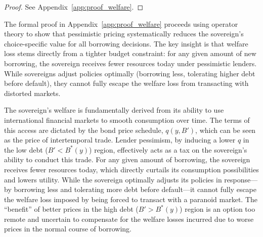 \documentclass[12pt]{article}
\theoremstyle{plain}
\begin{document}
\begin{proof}
	See Appendix~\ref{app:proof_welfare}.
\end{proof}
The formal proof in Appendix~\ref{app:proof_welfare} proceeds using operator theory to show that pessimistic pricing systematically reduces the sovereign's choice-specific value for all borrowing decisions. The key insight is that welfare loss stems directly from a tighter budget constraint: for any given amount of new borrowing, the sovereign receives fewer resources today under pessimistic lenders. While sovereigns adjust policies optimally (borrowing less, tolerating higher debt before default), they cannot fully escape the welfare loss from transacting with distorted markets.

The sovereign's welfare is fundamentally derived from its ability to use
international financial markets to smooth consumption over time. The terms of
this access are dictated by the bond price schedule, $q(y,B')$, which can be
seen as the price of intertemporal trade. Lender pessimism, by inducing a lower
$q$ in the low debt ($B' < B^*(y)$) region, effectively acts as a tax on the
sovereign's ability to conduct this trade. For any given amount of borrowing,
the sovereign receives fewer resources today, which directly curtails its
consumption possibilities and lowers utility. While the sovereign optimally
adjusts its policies in response—by borrowing less and tolerating more debt
before default—it cannot fully escape the welfare loss imposed by being forced
to transact with a paranoid market. The ``benefit'' of better prices in the
high debt ($B' > B^*(y)$) region is an option too remote and uncertain to
compensate for the welfare losses incurred due to worse prices in the normal
course of borrowing.
\end{document}
